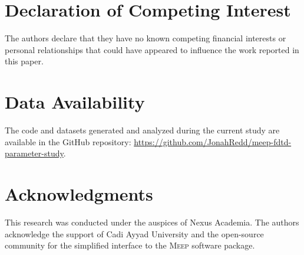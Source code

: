 \documentclass[12pt, a4paper]{article}
\newcommand{\meep}{\textsc{Meep}}
\begin{document}
\section*{Declaration of Competing Interest}
The authors declare that they have no known competing financial interests or personal relationships that could have appeared to influence the work reported in this paper.

\section*{Data Availability}
The code and datasets generated and analyzed during the current study are available in the GitHub repository: \url{https://github.com/JonahRedd/meep-fdtd-parameter-study}.

\section*{Acknowledgments}
This research was conducted under the auspices of Nexus Academia. The authors acknowledge the support of Cadi Ayyad University and the open-source community for the simplified interface to the \meep{} software package.





\end{document}
